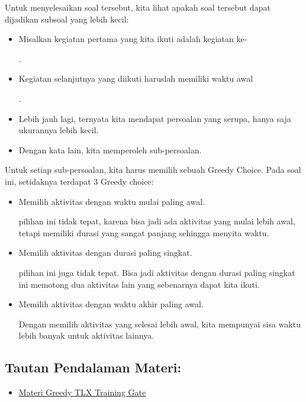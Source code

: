 \documentclass[]{article}
\providecommand{\tightlist}{%
  \setlength{\itemsep}{0pt}\setlength{\parskip}{0pt}}
\begin{document}
Untuk menyelesaikan soal tersebut, kita lihat apakah soal tersebut dapat
dijadikan subsoal yang lebih kecil:

\begin{itemize}
\tightlist
\item
  Misalkan kegiatan pertama yang kita ikuti adalah kegiatan ke-

  .
\item
  Kegiatan selanjutnya yang diikuti haruslah memiliki waktu awal

  .
\item
  Lebih jauh lagi, ternyata kita mendapat persoalan yang serupa, hanya
  saja ukurannya lebih kecil.
\item
  Dengan kata lain, kita memperoleh sub-persoalan.
\end{itemize}

Untuk setiap sub-persoalan, kita harus memilih sebuah Greedy Choice.
Pada soal ini, setidaknya terdapat 3 Greedy choice:

\begin{itemize}
\item
  Memilih aktivitas dengan waktu mulai paling awal.

  pilihan ini tidak tepat, karena bisa jadi ada aktivitas yang mulai
  lebih awal, tetapi memiliki durasi yang sangat panjang sehingga
  menyita waktu.
\item
  Memilih aktivitas dengan durasi paling singkat.

  pilihan ini juga tidak tepat. Bisa jadi aktivitas dengan durasi paling
  singkat ini memotong dua aktivitas lain yang sebenarnya dapat kita
  ikuti.
\item
  Memilih aktivitas dengan waktu akhir paling awal.

  Dengan memilih aktivitas yang selesai lebih awal, kita mempunyai sisa
  waktu lebih banyak untuk aktivitas lainnya.
\end{itemize}

\subsection{Tautan Pendalaman Materi:}\label{tautan-pendalaman-materi}

\begin{itemize}
\tightlist
\item
  \href{https://training.ia-toki.org/training/curriculums/1/courses/11/chapters/54/lessons/22/}{Materi
  Greedy TLX Training Gate}
\end{itemize}
\end{document}
